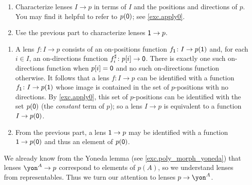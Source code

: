 \documentclass[Book-Poly]{subfiles}
\begin{document}
\begin{exercise}
  \begin{enumerate}
    \item Characterize lenses $I\to p$ in terms of $I$ and the positions and directions of $p$.
    You may find it helpful to refer to $p(\textsf{0})$; see \cref{exc.apply0}.
    \item Use the previous part to characterize lenses $\textsf{1}\to p$. \qedhere
  \end{enumerate}
  \begin{solution}
  \begin{enumerate}
    \item A lens $f\colon I\to p$ consists of an on-positions function $f_{\textsf{1}}\colon I\to p(\textsf{1})$ and, for each $i\in I$, an on-directions function $f^\sharp_i\colon p[i]\to\textsf{0}$.
    There is exactly one such on-directions function when $p[i]=\textsf{0}$ and no such on-directions function otherwise.
    It follows that a lens $f\colon I\to p$ can be identified with a function $f_{\textsf{1}}\colon I\to p(\textsf{1})$ whose image is contained in the set of $p$-positions with no directions.
    By \cref{exc.apply0}, this set of $p$-positions can be identified with the set $p(\textsf{0})$ (the \emph{constant} term of $p$); so a lens $I\to p$ is equivalent to a function $I\to p(\textsf{0})$.
    \item From the previous part, a lens $\textsf{1}\to p$ may be identified with a function $\textsf{1}\to p(\textsf{0})$ and thus an element of $p(\textsf{0})$.
  \end{enumerate}
  \end{solution}
\end{exercise}


We already know from the Yoneda lemma (see \cref{exc.poly_morph_yoneda}) that lenses $\yon^A\to p$ correspond to elements of $p(A)$, so we understand lenses from representables. Thus we turn our attention to lenses $p\to\yon^A$.
\end{document}
